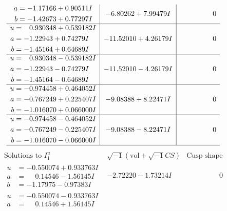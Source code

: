 \documentclass[1p]{elsarticle_modified}
\theoremstyle{definition}
\newcommand{\I}{\sqrt{-1}}
\begin{document}
$$\begin{array}{c|c|c}
\begin{aligned}
a &= -1.17166 + 0.90511 I \\
b &= -1.42673 + 0.77297 I\end{aligned}
 & -6.80262 + 7.99479 I & \phantom{-0.000000 } 0 \\ \hline\begin{aligned}
u &= \phantom{-}0.930348 + 0.539182 I \\
a &= -1.22943 + 0.74279 I \\
b &= -1.45164 + 0.64689 I\end{aligned}
 & -11.52010 + 4.26179 I & \phantom{-0.000000 } 0 \\ \hline\begin{aligned}
u &= \phantom{-}0.930348 - 0.539182 I \\
a &= -1.22943 - 0.74279 I \\
b &= -1.45164 - 0.64689 I\end{aligned}
 & -11.52010 - 4.26179 I & \phantom{-0.000000 } 0 \\ \hline\begin{aligned}
u &= -0.974458 + 0.464052 I \\
a &= -0.767249 + 0.225407 I \\
b &= -1.016070 + 0.066000 I\end{aligned}
 & -9.08388 + 8.22471 I & \phantom{-0.000000 } 0 \\ \hline\begin{aligned}
u &= -0.974458 - 0.464052 I \\
a &= -0.767249 - 0.225407 I \\
b &= -1.016070 - 0.066000 I\end{aligned}
 & -9.08388 - 8.22471 I & \phantom{-0.000000 } 0\\
 \hline 
 \end{array}$$\newpage$$\begin{array}{c|c|c}  
\text{Solutions to }I^u_{1}& \I (\text{vol} + \sqrt{-1}CS) & \text{Cusp shape}\\
 \hline 
\begin{aligned}
u &= -0.550074 + 0.933763 I \\
a &= \phantom{-}0.14546 - 1.56145 I \\
b &= -1.17975 - 0.97383 I\end{aligned}
 & -2.72220 - 1.73214 I & \phantom{-0.000000 } 0 \\ \hline\begin{aligned}
u &= -0.550074 - 0.933763 I \\
a &= \phantom{-}0.14546 + 1.56145 I \\

\end{aligned}
\end{array}$$
\end{document}
